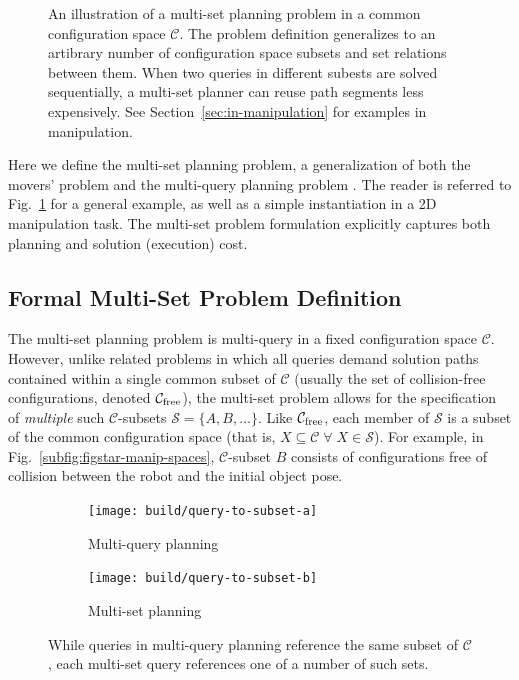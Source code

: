 \begin{figure}
\begin{widepage}
\caption{An illustration of a multi-set planning
  problem in a common configuration space $\mathcal{C}$.
  The problem definition generalizes to an artibrary number of
  configuration space subsets and set relations between them.
  When two queries in different subests are solved sequentially,
  a multi-set planner can reuse path segments less expensively.
  See Section~\ref{sec:in-manipulation} for examples in
  manipulation.}
\label{fig:multi-set}
\end{widepage}
\end{figure}

Here we define the multi-set planning problem,
a generalization of both the movers' problem
and the multi-query planning problem
\cite{kavrakietal1996prm}.
The reader is referred to
Fig.~\ref{fig:multi-set}
for a general example,
as well as a simple instantiation in a 2D manipulation task.
The multi-set problem formulation
explicitly captures both planning and
solution (execution) cost.

\subsection{Formal Multi-Set Problem Definition}
\label{subsec:problem-definition}

The multi-set planning problem is multi-query in
a fixed configuration space $\mathcal{C}$.
However, unlike related problems in which all
queries demand solution paths contained within a single common subset of
$\mathcal{C}$
(usually the set of collision-free configurations, denoted
$\mathcal{C}_{\mbox{\scriptsize free}}$),
the multi-set problem allows for the specification of
\emph{multiple} such $\mathcal{C}$-subsets
$\mathcal{S} = \{ A, B, \dots \}$.
Like $\mathcal{C}_{\mbox{\scriptsize free}}$,
each member of $\mathcal{S}$
is a subset of the common configuration space
(that is,
$X \subseteq \mathcal{C} \;\forall\; X \in \mathcal{S}$).
For example, in Fig.~\ref{subfig:figstar-manip-spaces},
$\mathcal{C}$-subset $B$
consists of configurations
free of collision between the robot and
the initial object pose.

\begin{figure}
\centering
\begin{subfigure}[t]{0.45\linewidth}
\centering
\texttt{[image: build/query-to-subset-a]}
\caption{Multi-query planning}
\end{subfigure}%
\quad\quad%
\begin{subfigure}[t]{0.45\linewidth}
\centering
\texttt{[image: build/query-to-subset-b]}
\caption{Multi-set planning}
\end{subfigure}
\caption{While queries in multi-query planning reference
  the same subset of $\mathcal{C}$,
  each multi-set query references one of a number of such sets.}
\label{fig:query-to-subset}
\end{figure}

